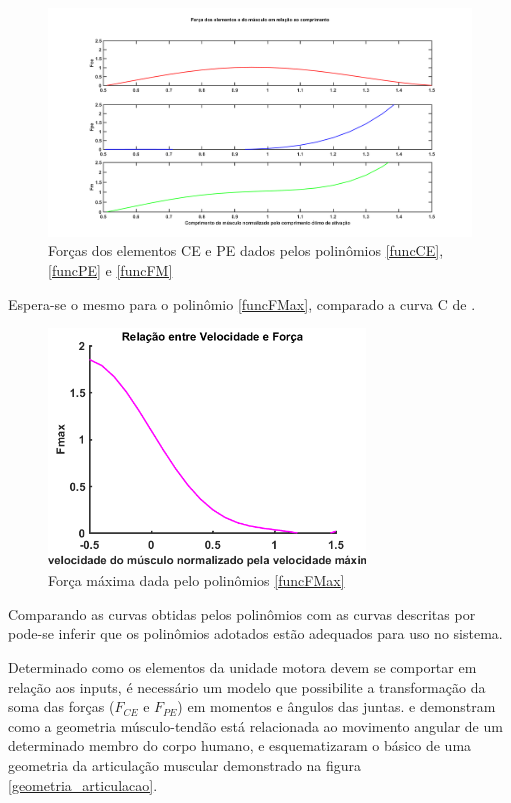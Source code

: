 \begin{figure}[H]
\centering
\includegraphics[width = 1\textwidth]{img/forcas_elementos.png}
\caption[Forças dos Elementos CE e PE]{Forças dos elementos CE e PE dados pelos polinômios \ref{funcCE},\ref{funcPE} e \ref{funcFM}}
\label{graficos_forcas_elementos}
\end{figure}

Espera-se o mesmo para o polinômio \ref{funcFMax}, comparado a curva C de \cite{zajac1989muscle}.

\begin{figure}[H]
\centering
\includegraphics[width = 0.75\textwidth]{img/forca_velocidade.png}
\caption[Relação Fmax e Velocidade do Músculo]{Força máxima dada pelo polinômios \ref{funcFMax}}
\label{graficos_forcas_elementos}
\end{figure}

Comparando as curvas obtidas pelos polinômios com as curvas descritas por \cite{zajac1989muscle} pode-se inferir que os polinômios adotados estão adequados para uso no sistema.

Determinado como os elementos da unidade motora devem se comportar em relação aos inputs, é necessário um modelo que possibilite a transformação da soma das forças ($F_{CE}$ e $F_{PE}$) em momentos e ângulos das juntas. \cite{giat1994simulation} e \cite{rosen1999performances} demonstram como a geometria músculo-tendão está relacionada ao movimento angular de um determinado membro do corpo humano, \cite{feng1999surface} e \cite{winters1988estimated} esquematizaram o básico de uma geometria da articulação muscular demonstrado na figura \ref{geometria_articulacao}.

